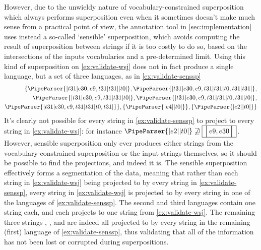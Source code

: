 \documentclass[a4paper,12pt,leqno]{article}
\newcommand{\vph}[1]{\vphantom{#1}}
\newcommand{\ebox}[1]{\fbox{$\vph{'(),}#1$}}
\newcommand{\nbBefore}[2]{\ebox{#1}\ebox{}\ebox{#2}}
\newcommand{\nbDuring}[2]{\ebox{#2}\ebox{#1,#2}\ebox{#2}}
\newcommand{\nbEquals}[2]{\ebox{#1,#2}}
\newcommand{\Before}[2]{\ebox{}\nbBefore{#1}{#2}\ebox{}}
\newcommand{\During}[2]{\ebox{}\nbDuring{#1}{#2}\ebox{}}
\newcommand{\Equals}[2]{\ebox{}\nbEquals{#1}{#2}\ebox{}}
\newcommand{\EventString}[1]{%
	\renewcommand*{\do}[1]{\ebox{##1}}%
	\PipeParser{#1}%
}
\begin{document}
However, due to the unwieldy nature of vocabulary-constrained superposition which always performs superposition even when it sometimes doesn't make much sense from a practical point of view, the annotation tool in \cref{sec:implementation} uses instead a so-called `sensible' superposition, which avoids computing the result of superposition between strings if it is too costly to do so, based on the intersections of the inputs vocabularies and a pre-determined limit. Using this kind of superposition on \cref{ex:validate-wsj} does not in fact produce a single language, but a set of three languages, as in \cref{ex:validate-senssp}
\begin{align}
	\{\EventString{{}|t31|e30,e9,t31|t31|{}|t0|{}}, \EventString{{}|t31|e30,e9,t31|t31|t0,t31|t31|{}},\label{ex:validate-senssp}\\
	\EventString{{}|t31|e30,e9,t31|t31|t0|{}}, \EventString{{}|t31|e30,e9,t31|t31|t0,t31|t0|{}},\notag\\
	\EventString{{}|t31|e30,e9,t31|t31|t0,t31|{}}\}, \{\EventString{{}|e4|{}|t0|{}}\}, \{\EventString{{}|e2|{}|t0|{}}\}\notag
\end{align}
It's clearly not possible for every string in \cref{ex:validate-senssp} to project to every string in \cref{ex:validate-wsj}: for instance $\EventString{{}|e2|{}|t0|{}} \not\sqsupseteq \Equals{e9}{e30}$. However, sensible superposition only ever produces either strings from the vocabulary-constrained superposition or the input strings themselves, so it should be possible to find the projections, and indeed it is. The sensible superposition effectively forms a segmentation of the data, meaning that rather than each string in \cref{ex:validate-wsj} being projected to by every string in \cref{ex:validate-senssp}, every string in \cref{ex:validate-wsj} is projected to by every string in one of the languages of \cref{ex:validate-senssp}. The second and third languages contain one string each, and each projects to one string from \cref{ex:validate-wsj}. The remaining three strings \Equals{e9}{e30}, \Before{e9}{t0}, and \During{e30}{t31} are indeed all projected to by every string in the remaining (first) language of \cref{ex:validate-senssp}, thus validating that all of the information has not been lost or corrupted during superpositions.

\newpage
\end{document}
